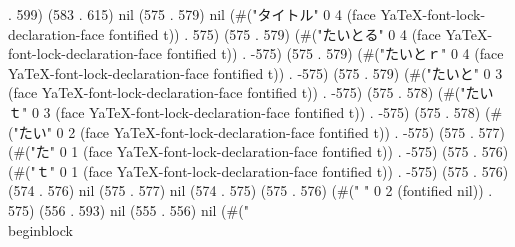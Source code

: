 . 599) (583 . 615) nil (575 . 579) nil (#("タイトル" 0 4 (face YaTeX-font-lock-declaration-face fontified t)) . 575) (575 . 579) (#("たいとる" 0 4 (face YaTeX-font-lock-declaration-face fontified t)) . -575) (575 . 579) (#("たいとｒ" 0 4 (face YaTeX-font-lock-declaration-face fontified t)) . -575) (575 . 579) (#("たいと" 0 3 (face YaTeX-font-lock-declaration-face fontified t)) . -575) (575 . 578) (#("たいｔ" 0 3 (face YaTeX-font-lock-declaration-face fontified t)) . -575) (575 . 578) (#("たい" 0 2 (face YaTeX-font-lock-declaration-face fontified t)) . -575) (575 . 577) (#("た" 0 1 (face YaTeX-font-lock-declaration-face fontified t)) . -575) (575 . 576) (#("ｔ" 0 1 (face YaTeX-font-lock-declaration-face fontified t)) . -575) (575 . 576) (574 . 576) nil (575 . 577) nil (574 . 575) (575 . 576) (#("  " 0 2 (fontified nil)) . 575) (556 . 593) nil (555 . 556) nil (#(" \\begin{block}
  
